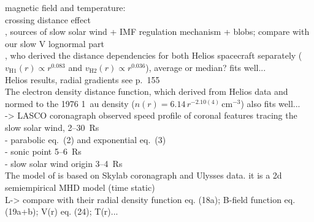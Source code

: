magnetic field and temperature:\\
crossing distance effect\\

\citet{Wang2000}, sources of slow solar wind + IMF regulation mechanism + blobs; compare with our slow V lognormal part\\

\citet{Schwenn1983,Schwenn1990}, who derived the distance dependencies for both Helios spacecraft separately ($v_\text{H1}(r) \propto r^{0.083}$ and $v_\text{H2}(r) \propto r^{0.036}$), average or median? fits well...\\
Helios results, radial gradients see \citet{Schwenn1990} p.~155\\

The electron density distance function, which \citet{Bougeret1984} derived from Helios data and normed to the 1976 1~au density ($n(r) = 6.14\,r^{-2.10(4)}\,\text{cm}^{-3}$) also fits well...\\

\citet{Sheeley1997} -> LASCO coronagraph observed speed profile of coronal features tracing the slow solar wind, 2--30~Rs\\
- parabolic eq.~(2) and exponential eq.~(3)\\
- sonic point 5--6~Rs\\
- slow solar wind origin 3--4~Rs\\

The model of \citet{Sittler1999} is based on Skylab coronagraph and Ulysses data. it is a 2d semiempirical MHD model (time static)\\
L-> compare with their radial density function eq. (18a); B-field function eq. (19a+b); V(r) eq. (24); T(r)...\\

